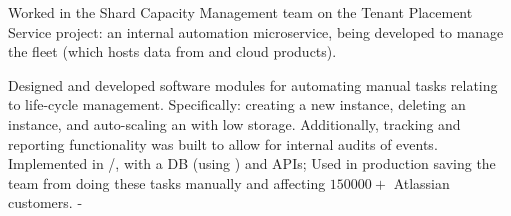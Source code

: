 \documentclass[a4paper]{resume}
\begin{document}
\begin{minipage}[t]{0.66\textwidth}
	\begin{tightitemize}
		\item {
		            Worked in the Shard Capacity Management team on the Tenant Placement Service project: an internal \aws{}
		            automation microservice, being developed to manage the \rds{} fleet (which hosts data from \jira{} and
		            \conf{} cloud products).
		      }
		\item {
		            Designed and developed software modules for automating manual tasks relating to \rds{} life-cycle
		            management. Specifically: creating a new \rds{} instance, deleting an \rds{} instance, and auto-scaling
		            an \rds{} with low storage. Additionally, tracking and reporting functionality was built to allow for
		            internal audits of \rds{} events. Implemented in \kotlin{}/\spring{}, with a \postgres{} DB (using
		            \jpa{}) and \rest{} APIs; Used in production saving the team from doing these tasks manually and
		            affecting $\num{150000} +$ Atlassian customers.
		      }-
	\end{tightitemize}
	\smallsectionspace{}

\end{minipage}
\end{document}
